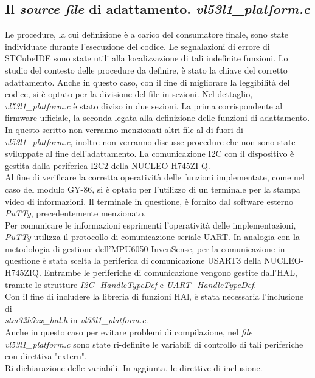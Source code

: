 \subsection{Il \textit{source file} di adattamento. \textit{vl53l1\_platform.c}}
Le procedure, la cui definizione è a carico del consumatore finale, sono state individuate durante l'esecuzione del codice. Le segnalazioni di errore di STCubeIDE sono state utili alla localizzazione di tali indefinite funzioni.
Lo studio del contesto delle procedure da definire, è stato la chiave del corretto adattamento.
Anche in questo caso, con il fine di migliorare la leggibilità del codice, si è optato per la divisione del file in sezioni. Nel dettaglio, \textit{vl53l1\_platform.c} è stato diviso in due sezioni.
La prima corrispondente al firmware ufficiale, la seconda legata alla definizione delle funzioni di adattamento.\\
In questo scritto non verranno menzionati altri file al di fuori di \textit{vl53l1\_platform.c}, inoltre non verranno discusse procedure che non sono state sviluppate al fine dell'adattamento.
La comunicazione I2C con il dispositivo è gestita dalla periferica I2C2 della NUCLEO-H745ZI-Q.\\
Al fine di verificare la corretta operatività delle funzioni implementate, come nel caso del modulo GY-86, si è optato per l'utilizzo di un terminale per la stampa video di informazioni. Il terminale in questione, è fornito dal software esterno \textit{PuTTy}, precedentemente menzionato.\\
Per comunicare le informazioni esprimenti l'operatività delle implementazioni, \textit{PuTTy} utilizza il protocollo di comunicazione seriale UART. In analogia con la metodologia di gestione dell'MPU6050 InvenSense, per la comunicazione in questione è stata scelta la periferica di comunicazione USART3 della NUCLEO-H745ZIQ.
Entrambe le periferiche di comunicazione vengono gestite dall'HAL, tramite le strutture \textit{I2C\_HandleTypeDef} e \textit{UART\_HandleTypeDef}.\\
Con il fine di includere la libreria di funzioni HAl, è stata necessaria l'inclusione di\\\textit{stm32h7xx\_hal.h} in \textit{vl53l1\_platform.c}.\\
Anche in questo caso per evitare problemi di compilazione, nel \textit{file vl53l1\_platform.c} sono state ri-definite le variabili di controllo di tali periferiche con direttiva "extern".\\
Ri-dichiarazione delle variabili. In aggiunta, le direttive di inclusione.

